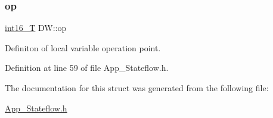 \subsubsection{\texorpdfstring{op}{op}}
{\footnotesize\ttfamily \mbox{\hyperlink{_app___stateflowtypes_8h_ad73c6af88bb2ce70799e51f639309f21}{int16\+\_\+T}} D\+W\+::op}



Definiton of local variable operation point. 



Definition at line 59 of file App\+\_\+\+Stateflow.\+h.



The documentation for this struct was generated from the following file\+:\begin{DoxyCompactItemize}
\item 
\mbox{\hyperlink{_app___stateflow_8h}{App\+\_\+\+Stateflow.\+h}}\end{DoxyCompactItemize}
